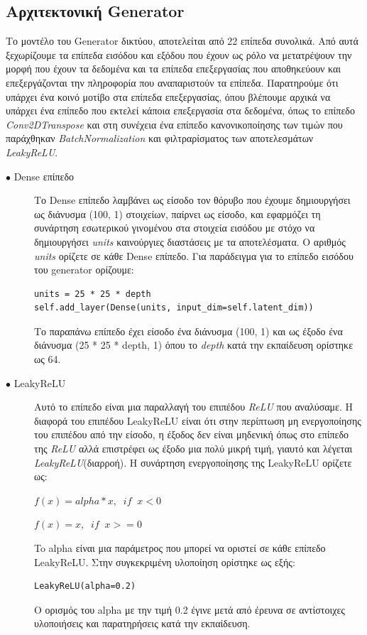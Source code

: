 \subsection{Αρχιτεκτονική Generator}
Το μοντέλο του Generator δικτύου, αποτελείται από 22 επίπεδα συνολικά. Από αυτά ξεχωρίζουμε τα επίπεδα εισόδου και εξόδου που έχουν ως ρόλο να μετατρέψουν την μορφή που έχουν τα δεδομένα και τα επίπεδα επεξεργασίας που αποθηκεύουν και επεξεργάζονται την πληροφορία που αναπαριστούν τα επίπεδα. Παρατηρούμε ότι υπάρχει ένα κοινό μοτίβο στα επίπεδα επεξεργασίας, όπου βλέπουμε αρχικά να υπάρχει ένα επίπεδο που εκτελεί κάποια επεξεργασία στα δεδομένα, όπως το επίπεδο \textit{Conv2DTranspose} και στη συνέχεια ένα επίπεδο κανονικοποίησης των τιμών που παράχθηκαν \textit{BatchNormalization} και φιλτραρίσματος των αποτελεσμάτων \textit{LeakyReLU}.

\begin{description}
\item[$\bullet$ Dense επίπεδο] Το Dense επίπεδο λαμβάνει ως είσοδο τον θόρυβο που έχουμε δημιουργήσει ως διάνυσμα (100, 1) στοιχείων, παίρνει ως είσοδο, και εφαρμόζει τη συνάρτηση εσωτερικού γινομένου στα στοιχεία εισόδου με στόχο να δημιουργήσει \textit{units} καινούργιες διαστάσεις με τα αποτελέσματα. Ο αριθμός \textit{units} ορίζετε σε κάθε Dense επίπεδο. Για παράδειγμα για το επίπεδο εισόδου του generator ορίζουμε:
\begin{verbatim}
units = 25 * 25 * depth
self.add_layer(Dense(units, input_dim=self.latent_dim))
\end{verbatim}
\par
Το παραπάνω επίπεδο έχει είσοδο ένα διάνυσμα (100, 1) και ως έξοδο ένα διάνυσμα (25 * 25 * depth, 1) όπου το \textit{depth} κατά την εκπαίδευση ορίστηκε ως 64. \cite{dense}
\end{description}

\begin{description}
\item[$\bullet$ LeakyReLU] Αυτό το επίπεδο είναι μια παραλλαγή του επιπέδου \textit{ReLU} που αναλύσαμε. Η διαφορά  του επιπέδου LeakyReLU είναι ότι στην περίπτωση μη ενεργοποίησης του επιπέδου από την είσοδο, η έξοδος δεν είναι μηδενική όπως στο επίπεδο της \textit{ReLU} αλλά επιστρέφει ως έξοδο μια πολύ μικρή τιμή, γιαυτό και λέγεται \textit{LeakyReLU}(διαρροή). Η συνάρτηση ενεργοποίησης της LeakyReLU ορίζετε ως:
\par
$f(x) = alpha * x,  \;\; if \;\; x < 0$
\par
$f(x) = x,  \;\; if \;\; x >= 0$
\par
To alpha είναι μια παράμετρος που μπορεί να οριστεί σε κάθε επίπεδο LeakyReLU. Στην συγκεκριμένη υλοποίηση ορίστηκε ως εξής:
\begin{verbatim}
LeakyReLU(alpha=0.2)
\end{verbatim}
\par
O ορισμός του alpha με την τιμή 0.2 έγινε μετά από έρευνα σε αντίστοιχες υλοποιήσεις και παρατηρήσεις κατά την εκπαίδευση. \cite{firstgan} \cite{firstgan2} \cite{firstgan3} \cite{leakyrelu}
\end{description}

